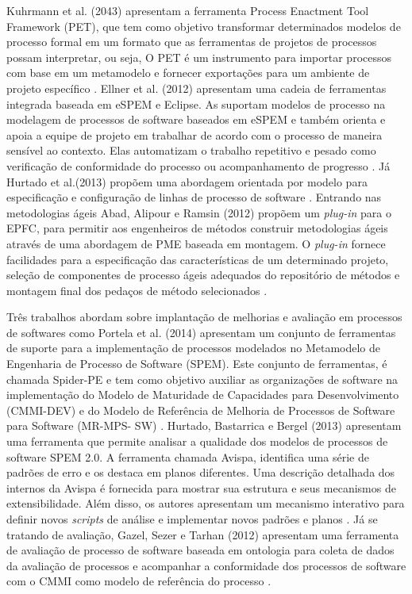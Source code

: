  Kuhrmann et al. (2043) apresentam a ferramenta Process Enactment Tool Framework (PET), que tem como objetivo transformar determinados modelos de processo formal em um formato que as ferramentas de projetos de processos possam interpretar, ou seja,  O PET é um instrumento para importar processos com base em um metamodelo e fornecer exportações para um ambiente de projeto específico \cite{1kuhrmann:2014}. Ellner et al. (2012) apresentam uma cadeia de ferramentas integrada baseada em eSPEM e Eclipse. As suportam modelos de processo na modelagem de processos de software baseados em eSPEM e também orienta e apoia a equipe de projeto em trabalhar de acordo com o processo de maneira sensível ao contexto. Elas automatizam o trabalho repetitivo e pesado como verificação de conformidade do processo ou acompanhamento de progresso \cite{10ellner:2012}. Já Hurtado et al.(2013) propõem uma abordagem orientada por modelo para especificação e configuração de linhas de processo de software \cite{8hurtado:2013}. Entrando nas metodologias ágeis Abad, Alipour e Ramsin (2012)  propõem um \textit{plug-in} para o EPFC, para permitir aos engenheiros de métodos construir metodologias ágeis através de uma abordagem de PME baseada em montagem. O \textit{plug-in} fornece facilidades para a especificação das características de um determinado projeto, seleção de componentes de processo ágeis adequados do repositório de métodos e montagem final dos pedaços de método selecionados \cite{13abad:2012}.
 
 
Três trabalhos abordam sobre implantação de melhorias e avaliação em processos de softwares como Portela et al. (2014) apresentam um conjunto de ferramentas de suporte para a implementação de processos modelados no Metamodelo de Engenharia de Processo de Software (SPEM). Este conjunto de ferramentas, é chamada Spider-PE e tem como objetivo auxiliar as organizações de software na implementação do Modelo de Maturidade de Capacidades para Desenvolvimento (CMMI-DEV) e do Modelo de Referência de Melhoria de Processos de Software para Software (MR-MPS- SW) \cite{9portela:2014}. Hurtado, Bastarrica e Bergel (2013) apresentam uma ferramenta que permite analisar a qualidade dos modelos de processos de software SPEM 2.0. A ferramenta chamada Avispa, identifica uma série de padrões de erro e os destaca em planos diferentes. Uma descrição detalhada dos internos da Avispa é fornecida para mostrar sua estrutura e seus mecanismos de extensibilidade. Além disso, os autores apresentam um mecanismo interativo para definir novos \textit{scripts} de análise e implementar novos padrões e planos \cite{6hurtado:2013}. 
Já se tratando de avaliação, Gazel, Sezer e Tarhan (2012) apresentam uma ferramenta de avaliação de processo de software baseada em ontologia para coleta de dados da avaliação de processos e acompanhar a conformidade dos processos de software com o CMMI como modelo de referência do processo \cite{7gazel:2012}. 



